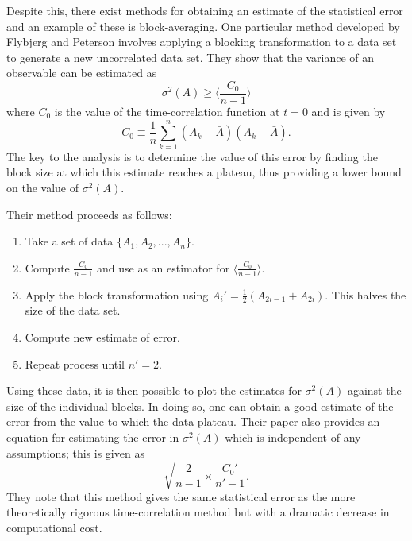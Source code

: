 Despite this, there exist methods for obtaining an estimate of the statistical error and an example of these is block-averaging.
One particular method developed by Flybjerg and Peterson involves applying a blocking transformation to a data set to generate a new uncorrelated data set\cite{Flyvbjerg1989}.
They show that the variance of an observable can be estimated as
$$\sigma^{2}(A) \geq \bigg \langle \frac{C_{0}}{n-1} \bigg \rangle$$
where $C_{0}$ is the value of the time-correlation function at $t=0$ and is given by
$$C_{0} \equiv \frac{1}{n} \sum_{k=1}^{n}(A_{k} - \bar{A})(A_{k} - \bar{A}).$$
The key to the analysis is to determine the value of this error by finding the block size at which this estimate reaches a plateau, thus providing a lower bound on the value of $\sigma^{2}(A)$. 

Their method proceeds as follows:
\begin{enumerate}
 \item Take a set of data $\{A_{1},A_{2},...,A_{n}\}$.
 \item Compute $\frac{C_{0}}{n-1}$ and use as an estimator for $\big \langle \frac{C_{0}}{n-1} \big \rangle$.
 \item Apply the block transformation using
	$A_{i}' = \frac{1}{2} (A_{2i-1} + A_{2i}).$
	This halves the size of the data set.
 \item Compute new estimate of error.
 \item Repeat process until $n' = 2$.
\end{enumerate}

Using these data, it is then possible to plot the estimates for $\sigma^{2}(A)$ against the size of the individual blocks.
In doing so, one can obtain a good estimate of the error from the value to which the data plateau.
Their paper also provides an equation for estimating the error in $\sigma^{2}(A)$ which is independent of any assumptions; this is given as
$$\sqrt{\frac{2}{n-1} \times \frac{C_{0}'}{n'-1}}.$$
They note that this method gives the same statistical error as the more theoretically rigorous time-correlation method but with a dramatic decrease in computational cost.

